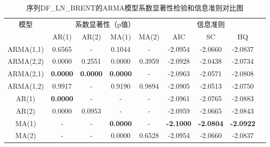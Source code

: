 \documentclass[12pt,a4paper]{ctexart}
\begin{document}
\begin{table}[H]
\centering
\caption{序列DF\_LN\_BRENT的ARMA模型系数显著性检验和信息准则对比图}
\label{tab:arma_pvalue_brent}
\setlength{\tabcolsep}{4pt}  %
\begin{tabular}{cccccc ccc}
\toprule[1.2pt]
\multirow{2}{*}{模型} & \multicolumn{4}{c}{系数显著性（p值）} & \multicolumn{3}{c}{信息准则} \\
\cmidrule(lr){2-5} \cmidrule(lr){6-8}
& AR(1) & AR(2) & MA(1) & MA(2) & AIC & SC & HQ \\
\midrule[0.75pt]
ARMA(1,1)  & 0.6565 & - & 0.1044 & - & -2.0954 & -2.0660 & -2.0837 \\
ARMA(2,2)  & 0.0000 & 0.2551 & 0.0000 & 0.3959 & -2.0928 & -2.0438 & -2.0734 \\
ARMA(2,1)  & \textbf{0.0000} & \textbf{0.0000} & \textbf{0.0000} & -  & -2.0963 & -2.0571 & -2.0808 \\
ARMA(1,2)  & 0.9917 & - & 0.9190 & 0.9894 & -2.0905 & -2.0513 & -2.0750 \\
AR(1)      & \textbf{0.0000} & - & - & - & -2.0961 & -2.0765 & -2.0883 \\
AR(2)      & 0.0000 & 0.0953 & - & - & -2.0959 & -2.0665 & -2.0843 \\
MA(1)      & - & - & \textbf{0.0000} & - & \textbf{-2.1000} & \textbf{-2.0804} & \textbf{-2.0922} \\
MA(2)      & - & - & 0.0000 & 0.6528 & -2.0954 & -2.0660 & -2.0837 \\
\bottomrule[1.2pt]
\end{tabular}
\end{table}
\end{document}

